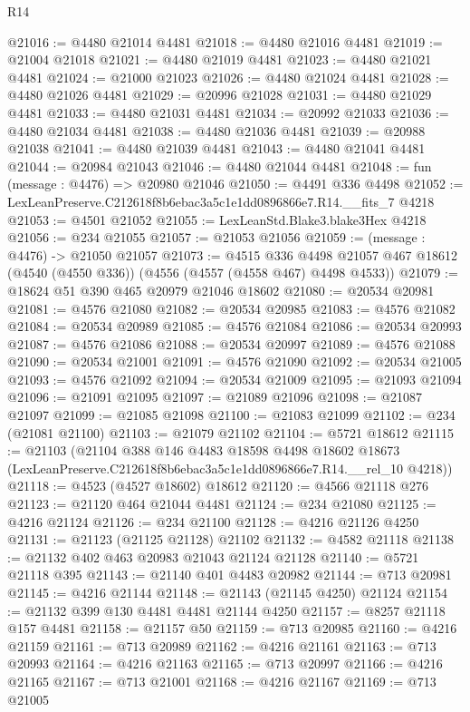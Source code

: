 \begin{lexlean}{R14}
\begin{coremodule}
@21016 := @4480 @21014 @4481
@21018 := @4480 @21016 @4481
@21019 := @21004 @21018
@21021 := @4480 @21019 @4481
@21023 := @4480 @21021 @4481
@21024 := @21000 @21023
@21026 := @4480 @21024 @4481
@21028 := @4480 @21026 @4481
@21029 := @20996 @21028
@21031 := @4480 @21029 @4481
@21033 := @4480 @21031 @4481
@21034 := @20992 @21033
@21036 := @4480 @21034 @4481
@21038 := @4480 @21036 @4481
@21039 := @20988 @21038
@21041 := @4480 @21039 @4481
@21043 := @4480 @21041 @4481
@21044 := @20984 @21043
@21046 := @4480 @21044 @4481
@21048 := fun (message : @4476) => @20980 @21046
@21050 := @4491 @336 @4498
@21052 := LexLeanPreserve.C212618f8b6ebac3a5c1e1dd0896866e7.R14.__fits_7 @4218
@21053 := @4501 @21052
@21055 := LexLeanStd.Blake3.blake3Hex @4218
@21056 := @234 @21055
@21057 := @21053 @21056
@21059 := (message : @4476) -> @21050 @21057
@21073 := @4515
    @336
    @4498
    @21057
    @467
    @18612
    (@4540 (@4550 @336))
    (@4556 (@4557 (@4558 @467) @4498 @4533))
@21079 := @18624 @51 @390 @465 @20979 @21046 @18602
@21080 := @20534 @20981
@21081 := @4576 @21080
@21082 := @20534 @20985
@21083 := @4576 @21082
@21084 := @20534 @20989
@21085 := @4576 @21084
@21086 := @20534 @20993
@21087 := @4576 @21086
@21088 := @20534 @20997
@21089 := @4576 @21088
@21090 := @20534 @21001
@21091 := @4576 @21090
@21092 := @20534 @21005
@21093 := @4576 @21092
@21094 := @20534 @21009
@21095 := @21093 @21094
@21096 := @21091 @21095
@21097 := @21089 @21096
@21098 := @21087 @21097
@21099 := @21085 @21098
@21100 := @21083 @21099
@21102 := @234 (@21081 @21100)
@21103 := @21079 @21102
@21104 := @5721 @18612
@21115 := @21103
    (@21104
      @388
      @146
      @4483
      @18598
      @4498
      @18602
      @18673
      (LexLeanPreserve.C212618f8b6ebac3a5c1e1dd0896866e7.R14.__rel_10 @4218))
@21118 := @4523 (@4527 @18602) @18612
@21120 := @4566 @21118 @276
@21123 := @21120 @464 @21044 @4481
@21124 := @234 @21080
@21125 := @4216 @21124
@21126 := @234 @21100
@21128 := @4216 @21126 @4250
@21131 := @21123 (@21125 @21128) @21102
@21132 := @4582 @21118
@21138 := @21132 @402 @463 @20983 @21043 @21124 @21128
@21140 := @5721 @21118 @395
@21143 := @21140 @401 @4483 @20982
@21144 := @713 @20981
@21145 := @4216 @21144
@21148 := @21143 (@21145 @4250) @21124
@21154 := @21132 @399 @130 @4481 @4481 @21144 @4250
@21157 := @8257 @21118 @157 @4481
@21158 := @21157 @50
@21159 := @713 @20985
@21160 := @4216 @21159
@21161 := @713 @20989
@21162 := @4216 @21161
@21163 := @713 @20993
@21164 := @4216 @21163
@21165 := @713 @20997
@21166 := @4216 @21165
@21167 := @713 @21001
@21168 := @4216 @21167
@21169 := @713 @21005

\end{coremodule}
\end{lexlean}
